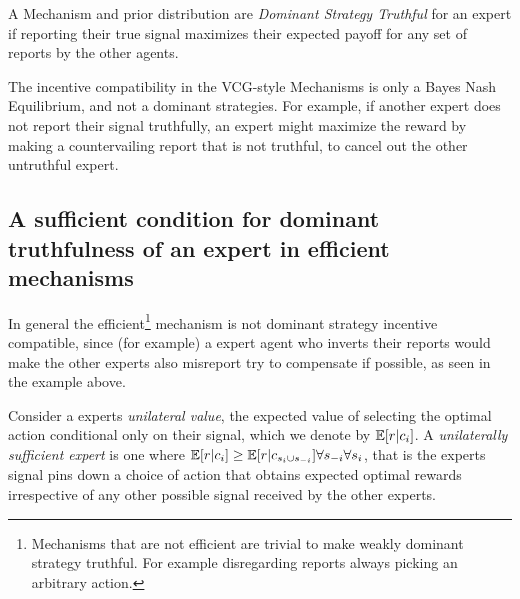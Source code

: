 \begin{defn}
	A Mechanism and prior distribution are \emph{Dominant Strategy Truthful} for an expert if reporting their true signal maximizes their expected payoff for any set of reports by the other agents. 
\end{defn}

The incentive compatibility in the VCG-style Mechanisms is only a Bayes Nash Equilibrium, and not a dominant strategies. For example, if another expert does not report their signal truthfully, an expert might maximize the reward by making a countervailing report that is not truthful, to cancel out the other untruthful expert. 



\subsection{A sufficient condition for dominant truthfulness of an expert in efficient mechanisms}

In general the efficient\footnote{Mechanisms that are not efficient are trivial to make weakly dominant strategy truthful. For example disregarding reports always picking an arbitrary action.} mechanism is not dominant strategy incentive compatible, since (for example) a expert agent who inverts their reports would make the other experts also misreport try to compensate if possible, as seen in the example above.

Consider a experts \emph{unilateral value}, the expected value of selecting the optimal action conditional only on their signal, which we denote by  $\operatorname*{\mathbb E}[ r| c_{i}]$. A \emph{unilaterally sufficient expert} is one where $\operatorname*{\mathbb E}[r|c_{i}] \geq \operatorname*{\mathbb E}[r|c_{s_i \cup s_{-i}}] \forall s_{-i} \forall s_{i}$, that is the experts signal pins down a choice of action that obtains expected optimal rewards irrespective of any other possible signal received by the other experts.



